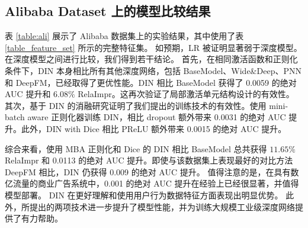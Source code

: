 \subsection{Alibaba Dataset 上的模型比较结果}
表 \ref{table:ali} 展示了 Alibaba 数据集上的实验结果，其中使用了表 \ref{table_feature_set} 所示的完整特征集。
如预期，LR 被证明显著弱于深度模型。
在深度模型之间进行比较，我们得到若干结论。
首先，在相同激活函数和正则化条件下，DIN 本身相比所有其他深度网络，包括 BaseModel、Wide\&Deep、PNN 和 DeepFM，已经取得了更优性能。DIN 相比 BaseModel 获得了 0.0059 的绝对 AUC 提升和 $6.08\%$ RelaImpr。这再次验证了局部激活单元结构设计的有效性。
其次，基于 DIN 的消融研究证明了我们提出的训练技术的有效性。使用 mini-batch aware 正则化器训练 DIN，相比 dropout 额外带来 0.0031 的绝对 AUC 提升。此外，DIN with Dice 相比 PReLU 额外带来 0.0015 的绝对 AUC 提升。

综合来看，使用 MBA 正则化和 Dice 的 DIN 相比 BaseModel 总共获得 $11.65\%$ RelaImpr 和 0.0113 的绝对 AUC 提升。即使与该数据集上表现最好的对比方法 DeepFM 相比，DIN 仍获得 0.009 的绝对 AUC 提升。
值得注意的是，在具有数亿流量的商业广告系统中，0.001 的绝对 AUC 提升在经验上已经很显著，并值得模型部署。
DIN 在更好理解和使用用户行为数据特征方面表现出明显优势。
此外，所提出的两项技术进一步提升了模型性能，并为训练大规模工业级深度网络提供了有力帮助。

